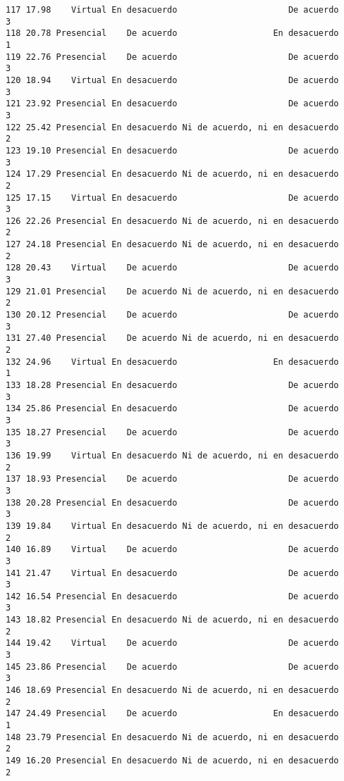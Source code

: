 \documentclass[
  letterpaper,
  DIV=11,
  numbers=noendperiod]{scrartcl}
\begin{document}
\begin{verbatim}
117 17.98    Virtual En desacuerdo                      De acuerdo           3
118 20.78 Presencial    De acuerdo                   En desacuerdo           1
119 22.76 Presencial    De acuerdo                      De acuerdo           3
120 18.94    Virtual En desacuerdo                      De acuerdo           3
121 23.92 Presencial En desacuerdo                      De acuerdo           3
122 25.42 Presencial En desacuerdo Ni de acuerdo, ni en desacuerdo           2
123 19.10 Presencial En desacuerdo                      De acuerdo           3
124 17.29 Presencial En desacuerdo Ni de acuerdo, ni en desacuerdo           2
125 17.15    Virtual En desacuerdo                      De acuerdo           3
126 22.26 Presencial En desacuerdo Ni de acuerdo, ni en desacuerdo           2
127 24.18 Presencial En desacuerdo Ni de acuerdo, ni en desacuerdo           2
128 20.43    Virtual    De acuerdo                      De acuerdo           3
129 21.01 Presencial    De acuerdo Ni de acuerdo, ni en desacuerdo           2
130 20.12 Presencial    De acuerdo                      De acuerdo           3
131 27.40 Presencial    De acuerdo Ni de acuerdo, ni en desacuerdo           2
132 24.96    Virtual En desacuerdo                   En desacuerdo           1
133 18.28 Presencial En desacuerdo                      De acuerdo           3
134 25.86 Presencial En desacuerdo                      De acuerdo           3
135 18.27 Presencial    De acuerdo                      De acuerdo           3
136 19.99    Virtual En desacuerdo Ni de acuerdo, ni en desacuerdo           2
137 18.93 Presencial    De acuerdo                      De acuerdo           3
138 20.28 Presencial En desacuerdo                      De acuerdo           3
139 19.84    Virtual En desacuerdo Ni de acuerdo, ni en desacuerdo           2
140 16.89    Virtual    De acuerdo                      De acuerdo           3
141 21.47    Virtual En desacuerdo                      De acuerdo           3
142 16.54 Presencial En desacuerdo                      De acuerdo           3
143 18.82 Presencial En desacuerdo Ni de acuerdo, ni en desacuerdo           2
144 19.42    Virtual    De acuerdo                      De acuerdo           3
145 23.86 Presencial    De acuerdo                      De acuerdo           3
146 18.69 Presencial En desacuerdo Ni de acuerdo, ni en desacuerdo           2
147 24.49 Presencial    De acuerdo                   En desacuerdo           1
148 23.79 Presencial En desacuerdo Ni de acuerdo, ni en desacuerdo           2
149 16.20 Presencial En desacuerdo Ni de acuerdo, ni en desacuerdo           2

\end{verbatim}
\end{document}

